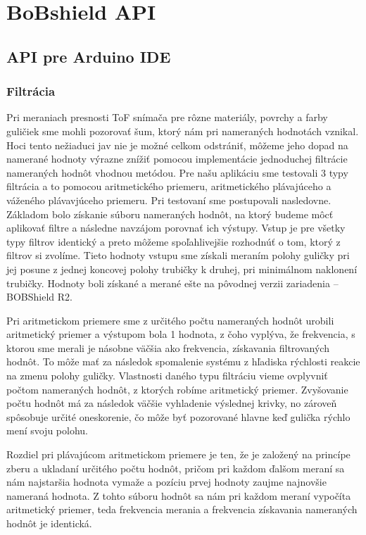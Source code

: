 \chapter{BoBshield API}
\label{kap:3}

\section{API pre Arduino IDE}
\label{kap:3.1}

\subsection{Filtrácia}
\label{kap:3.1.1}

Pri meraniach presnosti ToF snímača pre rôzne materiály, povrchy a farby guličiek sme mohli pozorovať šum, ktorý nám pri nameraných hodnotách vznikal. Hoci tento nežiaduci jav nie je možné celkom odstrániť, môžeme jeho dopad na namerané hodnoty výrazne znížiť pomocou implementácie jednoduchej filtrácie nameraných hodnôt vhodnou metódou.
Pre našu aplikáciu sme testovali 3 typy filtrácia a to pomocou aritmetického priemeru, aritmetického plávajúceho a váženého plávavjúceho priemeru. Pri testovaní sme postupovali nasledovne. Základom bolo získanie súboru nameraných hodnôt, na ktorý budeme môcť aplikovať filtre a následne navzájom porovnať ich výstupy. Vstup je pre všetky typy filtrov identický a preto môžeme spoľahlivejšie rozhodnúť o tom, ktorý z filtrov si zvolíme. Tieto hodnoty vstupu sme získali meraním polohy guličky pri jej posune z jednej koncovej polohy trubičky k druhej, pri minimálnom naklonení trubičky. Hodnoty boli získané a merané ešte na pôvodnej verzii zariadenia – BOBShield R2. 

Pri aritmetickom priemere sme z určitého počtu nameraných hodnôt urobili aritmetický priemer a výstupom bola 1 hodnota, z čoho vyplýva, že frekvencia, s ktorou sme merali je násobne väčšia ako frekvencia, získavania filtrovaných hodnôt. To môže mať za následok spomalenie systému z hľadiska rýchlosti reakcie na zmenu polohy guličky. Vlastnosti daného typu filtráciu vieme ovplyvniť počtom nameraných hodnôt, z ktorých robíme aritmetický priemer. Zvyšovanie počtu hodnôt má za následok väčšie vyhladenie výslednej krivky, no zároveň spôsobuje určité oneskorenie, čo môže byť pozorované hlavne keď gulička rýchlo mení svoju polohu. 

Rozdiel pri plávajúcom aritmetickom priemere je ten, že je založený na princípe zberu a ukladaní určitého počtu hodnôt, pričom pri každom ďalšom meraní sa nám najstaršia hodnota vymaže a pozíciu prvej hodnoty zaujme najnovšie nameraná hodnota. Z tohto súboru hodnôt sa nám pri každom meraní vypočíta aritmetický priemer, teda frekvencia merania a frekvencia získavania nameraných hodnôt je identická.

